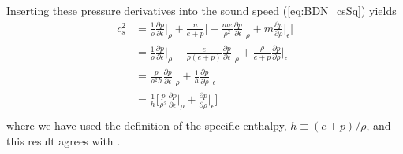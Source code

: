 \documentclass[12pt]{article}
\numberwithin{equation}{section}
\begin{document}
Inserting these pressure derivatives into the sound speed (\ref{eq:BDN_csSq}) yields
\begin{equation} \label{eq:csSq_eps_rho}
\begin{aligned}
c_s^2 &= \frac{1}{\rho} \frac{\partial p}{\partial \epsilon} \Big|_\rho + \frac{n}{e+p} \Big[ -\frac{m e}{\rho^2} \frac{\partial p}{\partial \epsilon} \Big|_\rho + m \frac{\partial p}{\partial \rho} \Big|_\epsilon \Big] \\
&= \frac{1}{\rho} \frac{\partial p}{\partial \epsilon} \Big|_\rho - \frac{e}{\rho (e+p)} \frac{\partial p}{\partial \epsilon} \Big|_\rho + \frac{\rho}{e+p} \frac{\partial p}{\partial \rho} \Big|_\epsilon \\
&= \frac{p}{\rho^2 h} \frac{\partial p}{\partial \epsilon} \Big|_\rho + \frac{1}{h} \frac{\partial p}{\partial \rho} \Big|_\epsilon \\
&= \frac{1}{h} \Big[ \frac{p}{\rho^2} \frac{\partial p}{\partial \epsilon} \Big|_\rho + \frac{\partial p}{\partial \rho} \Big|_\epsilon \Big] \\
\end{aligned}
\end{equation}
where we have used the definition of the specific enthalpy, $h \equiv (e+p)/\rho$, and this result agrees with \cite{RezzollaZanotti,Deppe22}.
\end{document}
